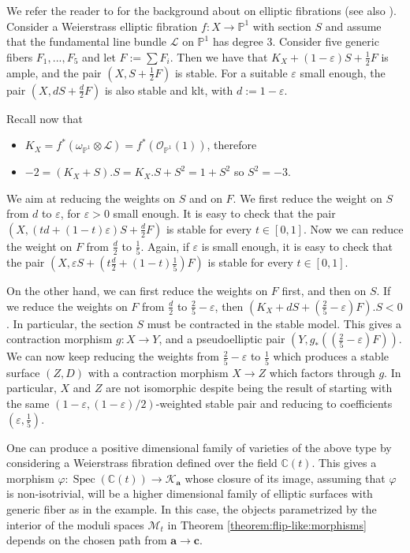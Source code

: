 \documentclass[11pt]{amsart}
\theoremstyle{definition}
\theoremstyle{remark}
\newcommand{\calO}{\mathcal O}
\newcommand{\calL}{\mathcal L}
\newcommand{\sK}{\mathscr{K}}
\newcommand{\sM}{\mathscr{M}}
\newcommand{\Spec}{\operatorname{Spec}}
\newcommand{\bfa}{\mathbf{a}}
\newcommand{\bfc}{\mathbf{c}}
\begin{document}
	
	We refer the reader to \cite{Mir89} for the background about on elliptic fibrations (see also \cite{lcmodelelliptic}).
	Consider a Weierstrass elliptic fibration $f:X \to \mathbb{P}^1$ with section $S$ and assume that the fundamental line bundle $\calL$ on $\mathbb{P}^1$ has degree 3. Consider five generic fibers $F_1,...,F_5$ and let $F:=\sum F_i$. Then we
	have that $K_X+(1-\varepsilon)S+ \frac{1}{2}F$ is ample, and the pair $(X,S+\frac{1}{2}F)$ is stable.
	For a suitable $\varepsilon$ small enough, the pair $(X,dS+\frac{d}{2}F)$ is also stable and klt, with $d:=1-\varepsilon$. 
	
	Recall now that
	\begin{itemize}
		\item $K_X=f^*(\omega_{\mathbb{P}^1} \otimes \calL)=f^*(\calO_{\mathbb{P}^1}(1))$, therefore
		\item $-2=(K_X+S).S=K_X.S+S^2=1+S^2$ so $S^2=-3$.
	\end{itemize}
	We aim at reducing the weights on $S$ and on $F$. We first reduce the weight on $S$ from $d$ to $\varepsilon$, for $\varepsilon > 0$ small enough. It is easy to check that the pair $(X,(td+(1-t)\varepsilon)S+\frac{d}{2}F)$ is stable for every $t \in [0,1]$. Now we can reduce the weight on $F$ from $\frac{d}{2}$ to $\frac{1}{5}$. Again, if $\varepsilon$ is small enough, it is easy to check that the pair $(X,\varepsilon S+(t\frac{d}{2}+(1-t)\frac{1}{5})F)$ is stable for every $t \in [0,1]$.
	
	
	On the other hand, we can first reduce the weights on $F$ first, and then on $S$. If we reduce the weights on $F$ from $\frac{d}{2}$ to $\frac{2}{5}-\varepsilon$, then $(K_X+dS+(\frac{2}{5}-\varepsilon)F).S<0$. In particular, the section $S$ must be contracted in the stable model. This gives a contraction morphism $g:X \to Y$, and a pseudoelliptic pair $(Y,g_*((\frac{2}{5}-\varepsilon)F))$. We can now keep reducing the weights from $\frac{2}{5}-\varepsilon$ to $\frac{1}{5}$ which produces a stable surface $(Z,D)$ with a contraction morphism $X \to Z$ which factors through $g$. In particular, $X$ and $Z$ are not isomorphic despite being the result of starting with the same $(1-\varepsilon, (1-\varepsilon)/2)$-weighted stable pair and reducing to coefficients $(\varepsilon, \frac{1}{5})$.
	
	One can produce a positive dimensional family of varieties of the above type by considering a Weierstrass fibration defined over the field $\mathbb{C}(t)$. This gives a morphism $\varphi : \Spec(\mathbb{C}(t)) \to \sK_{\mathbf{a}}$ whose closure of its image, assuming that $\varphi$ is non-isotrivial, will be a higher dimensional family of elliptic surfaces with generic fiber as in the example. In this case, the objects parametrized by the interior of the moduli spaces $\sM_t$ in Theorem \ref{theorem:flip-like:morphisms} depends on the chosen path from $\bfa \to \bfc$. 
	
\end{document}
